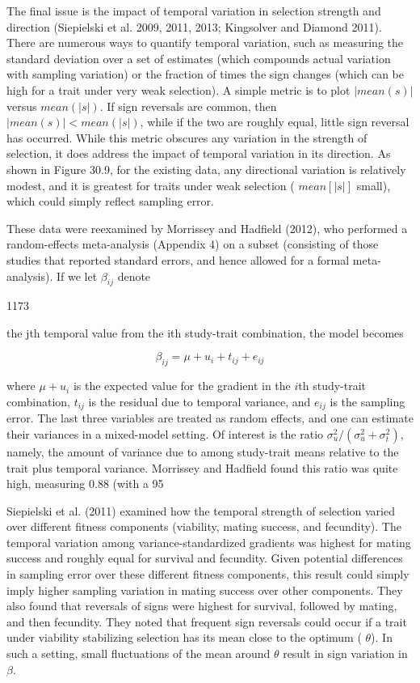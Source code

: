 \documentclass{article}
\begin{document}
The final issue is the impact of temporal variation in selection strength and direction (Siepielski et al. 2009, 2011, 2013; Kingsolver and Diamond 2011). There are numerous ways to quantify temporal variation, such as measuring the standard deviation over a set of estimates (which compounds actual variation with sampling variation) or the fraction of times the sign changes (which can be high for a trait under very weak selection). A simple metric is to plot  $ |mean(s)| $ versus  $ mean(|s|) $. If sign reversals are common, then  $ |mean(s)| < mean(|s|) $, while if the two are roughly equal, little sign reversal has occurred. While this metric obscures any variation in the strength of selection, it does address the impact of temporal variation in its direction. As shown in Figure 30.9, for the existing data, any directional variation is relatively modest, and it is greatest for traits under weak selection ( $ mean[|s|] $ small), which could simply reflect sampling error.

These data were reexamined by Morrissey and Hadfield (2012), who performed a random-effects meta-analysis (Appendix 4) on a subset (consisting of those studies that reported standard errors, and hence allowed for a formal meta-analysis). If we let  $ \beta_{ij} $ denote

1173

the jth temporal value from the ith study-trait combination, the model becomes

\begin{equation}
\beta_{ij}=\mu+u_{i}+t_{ij}+e_{ij}
\end{equation}

where  $ \mu + u_i $ is the expected value for the gradient in the  $ i $th study-trait combination,  $ t_{ij} $ is the residual due to temporal variance, and  $ e_{ij} $ is the sampling error. The last three variables are treated as random effects, and one can estimate their variances in a mixed-model setting. Of interest is the ratio  $ \sigma_u^2 / (\sigma_u^2 + \sigma_t^2) $, namely, the amount of variance due to among study-trait means relative to the trait plus temporal variance. Morrissey and Hadfield found this ratio was quite high, measuring 0.88 (with a 95%

Siepielski et al. (2011) examined how the temporal strength of selection varied over different fitness components (viability, mating success, and fecundity). The temporal variation among variance-standardized gradients was highest for mating success and roughly equal for survival and fecundity. Given potential differences in sampling error over these different fitness components, this result could simply imply higher sampling variation in mating success over other components. They also found that reversals of signs were highest for survival, followed by mating, and then fecundity. They noted that frequent sign reversals could occur if a trait under viability stabilizing selection has its mean close to the optimum ( $ \theta $). In such a setting, small fluctuations of the mean around  $ \theta $ result in sign variation in  $ \beta $.
\end{document}
